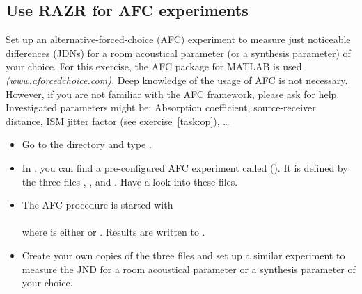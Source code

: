 \documentclass[a4paper, fleqn, 11pt]{article}
\begin{document}
\subsection{Use RAZR for AFC experiments}
Set up an alternative-forced-choice (AFC) experiment to measure just noticeable differences (JDNs) for a room acoustical parameter (or a synthesis parameter) of your choice. For this exercise, the AFC package for MATLAB is used \textit{(www.aforcedchoice.com).} Deep knowledge of the usage of AFC is not necessary. However, if you are not familiar with the AFC framework, please ask for help.\\
Investigated parameters might be: Absorption coefficient, source-receiver distance, ISM jitter factor (see exercise~\ref{task:op}), …
\begin{itemize}
  \item Go to the directory  and type .
  \item In , you can find a pre-configured AFC experiment called  (). It is defined by the three files , , and . Have a look into these files.
  \item The AFC procedure is started with\\
  \\
  where  is either  or . Results are written to .
  \item Create your own copies of the three files  and set up a similar experiment to measure the JND for a room acoustical parameter or a synthesis parameter of your choice.
\end{itemize}


\end{document}
